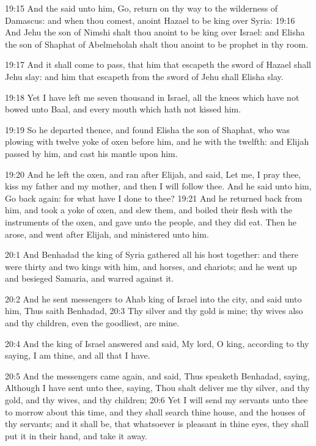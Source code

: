 19:15 And the \LORD said unto him, Go, return on thy way to the
wilderness of Damascus: and when thou comest, anoint Hazael to be king
over Syria: 19:16 And Jehu the son of Nimshi shalt thou anoint to be
king over Israel: and Elisha the son of Shaphat of Abelmeholah shalt
thou anoint to be prophet in thy room.

19:17 And it shall come to pass, that him that escapeth the sword of
Hazael shall Jehu slay: and him that escapeth from the sword of Jehu
shall Elisha slay.

19:18 Yet I have left me seven thousand in Israel, all the knees which
have not bowed unto Baal, and every mouth which hath not kissed him.

19:19 So he departed thence, and found Elisha the son of Shaphat, who
was plowing with twelve yoke of oxen before him, and he with the
twelfth: and Elijah passed by him, and cast his mantle upon him.

19:20 And he left the oxen, and ran after Elijah, and said, Let me, I
pray thee, kiss my father and my mother, and then I will follow thee.
And he said unto him, Go back again: for what have I done to thee?
19:21 And he returned back from him, and took a yoke of oxen, and slew
them, and boiled their flesh with the instruments of the oxen, and
gave unto the people, and they did eat. Then he arose, and went after
Elijah, and ministered unto him.

20:1 And Benhadad the king of Syria gathered all his host together:
and there were thirty and two kings with him, and horses, and
chariots; and he went up and besieged Samaria, and warred against it.

20:2 And he sent messengers to Ahab king of Israel into the city, and
said unto him, Thus saith Benhadad, 20:3 Thy silver and thy gold is
mine; thy wives also and thy children, even the goodliest, are mine.

20:4 And the king of Israel answered and said, My lord, O king,
according to thy saying, I am thine, and all that I have.

20:5 And the messengers came again, and said, Thus speaketh Benhadad,
saying, Although I have sent unto thee, saying, Thou shalt deliver me
thy silver, and thy gold, and thy wives, and thy children; 20:6 Yet I
will send my servants unto thee to morrow about this time, and they
shall search thine house, and the houses of thy servants; and it shall
be, that whatsoever is pleasant in thine eyes, they shall put it in
their hand, and take it away.

